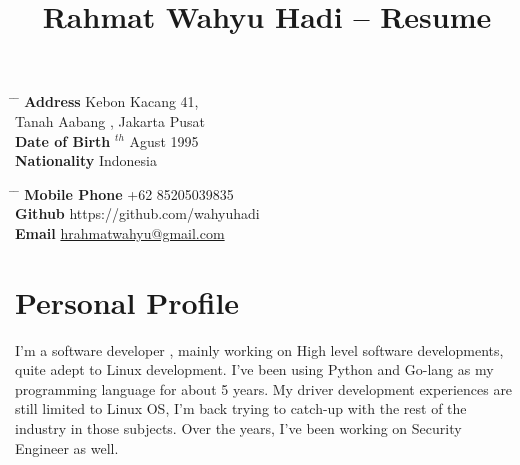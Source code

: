 \documentclass[10pt]{article} %
\begin{document}

\title{Rahmat Wahyu Hadi -- Resume} %


\parbox{0.5\textwidth}{ %
\begin{tabbing} %
\hspace{3cm} \= \hspace{4cm} \= \kill %
{\bf Address} \> Kebon Kacang 41,\\ %
\> Tanah Aabang , Jakarta Pusat  \\ %
{\bf Date of Birth} $^{th}$ Agust 1995 \\ %
{\bf Nationality} \> Indonesia %
\end{tabbing}}
\hfill %
\parbox{0.5\textwidth}{ %
\begin{tabbing} %
\hspace{3cm} \= \hspace{4cm} \= \kill %
{\bf Mobile Phone} \> +62 85205039835 \\ %
{\bf Github} \> https://github.com/wahyuhadi\\ %
{\bf Email} \> \href{mailto:hrahmatwahyu@gmail.com}{hrahmatwahyu@gmail.com} \\ %
\end{tabbing}}


\section{Personal Profile}

I'm a software developer , mainly working on High level software developments, quite adept to Linux development. 
I've been using Python and Go-lang as my programming language for about 5 years. My driver development experiences are still limited to Linux OS,  I'm back trying to catch-up with the rest of the industry in those subjects. Over the years, I've been working on  Security Engineer as well.
\end{document}
